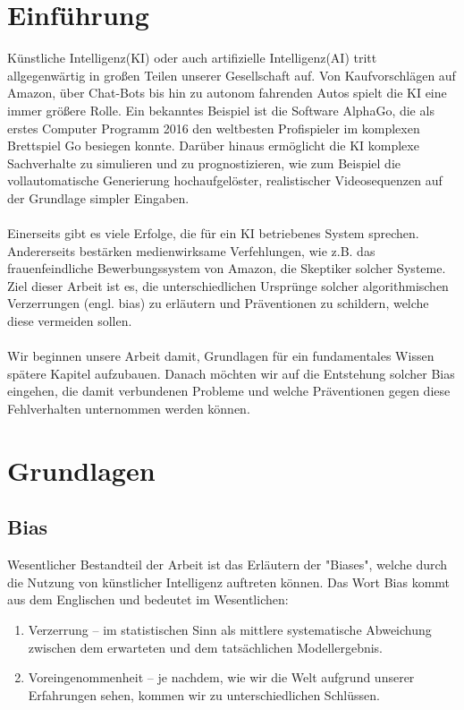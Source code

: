 \documentclass[12pt,oneside,a4paper,parskip]{scrbook}
\begin{document}
\chapter{Einführung}
\label{chapter:intro}
Künstliche Intelligenz(KI) oder auch artifizielle Intelligenz(AI) tritt allgegenwärtig in großen Teilen unserer Gesellschaft auf. Von Kaufvorschlägen auf Amazon, über Chat-Bots bis hin zu autonom fahrenden Autos spielt die KI eine immer größere Rolle. Ein bekanntes Beispiel ist die Software AlphaGo, die als erstes Computer Programm 2016 den weltbesten Profispieler im komplexen Brettspiel Go besiegen konnte\cite{alphaGo}. Darüber hinaus ermöglicht die KI komplexe Sachverhalte zu simulieren und zu prognostizieren, wie zum Beispiel die vollautomatische Generierung hochaufgelöster, realistischer Videosequenzen auf der Grundlage simpler Eingaben\cite{videoToVideo}.
\\\\
Einerseits gibt es viele Erfolge, die für ein KI betriebenes System sprechen. Andererseits bestärken medienwirksame Verfehlungen, wie z.B. das frauenfeindliche Bewerbungssystem von Amazon\cite{amazon}, die Skeptiker solcher Systeme. Ziel dieser Arbeit ist es, die unterschiedlichen Ursprünge solcher algorithmischen Verzerrungen (engl. bias) zu erläutern und Präventionen zu schildern, welche diese vermeiden sollen.
\\\\
Wir beginnen unsere Arbeit damit, Grundlagen für ein fundamentales Wissen spätere Kapitel aufzubauen. Danach möchten wir auf die Entstehung solcher Bias eingehen, die damit verbundenen Probleme und welche Präventionen gegen diese Fehlverhalten unternommen werden können.
\chapter{Grundlagen}
\section{Bias}
Wesentlicher Bestandteil der Arbeit ist das Erläutern der "Biases", welche durch die Nutzung von künstlicher Intelligenz auftreten können. Das Wort Bias kommt aus dem Englischen und bedeutet im Wesentlichen:
\begin{enumerate}
	\item Verzerrung – im statistischen Sinn als mittlere systematische Abweichung zwischen dem erwarteten und dem tatsächlichen Modellergebnis. %
	\item Voreingenommenheit – je nachdem, wie wir die Welt aufgrund unserer Erfahrungen sehen, kommen wir zu unterschiedlichen Schlüssen. %
\end{enumerate}
\end{document}

